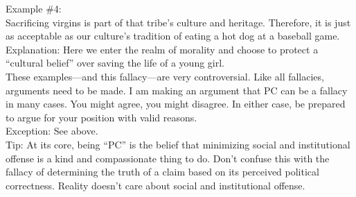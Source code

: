 \documentclass[a4paper,12pt,single,pdftex]{scrartcl}
\begin{document}
    
      Example \#4:
    \\

    
      Sacrificing virgins is part of that tribe's culture and heritage.  Therefore, it is just as acceptable as our culture’s tradition of eating a hot dog at a baseball game.
    \\

    
      Explanation: Here we enter the realm of morality and choose to protect a “cultural belief” over saving the life of a young girl. 
    \\

    
      These examples—and this fallacy—are very controversial.  Like all fallacies, arguments need to be made.  I am making an argument that PC can be a fallacy in many cases.  You might agree, you might disagree.  In either case, be prepared to argue for your position with valid reasons.
    \\

    
      Exception: See above.
    \\

    
      Tip: At its core, being “PC” is the belief that minimizing social and institutional offense is a kind and compassionate thing to do. Don’t confuse this with the fallacy of determining the truth of a claim based on its perceived political correctness. Reality doesn’t care about social and institutional offense.
    \\
\end{document}
